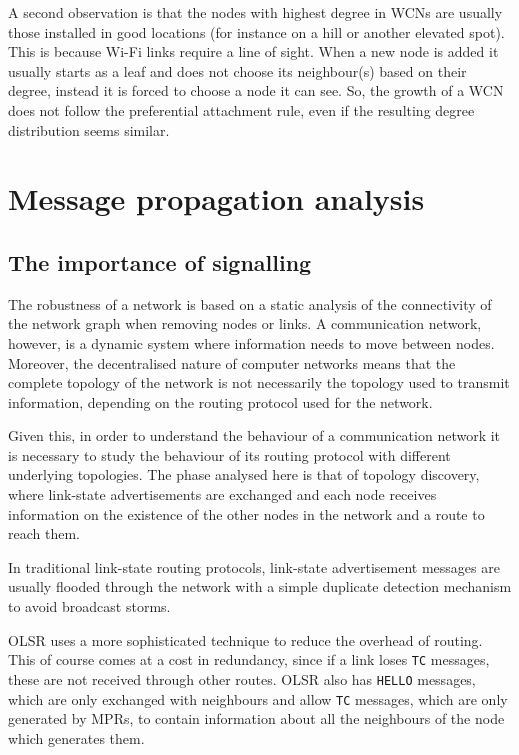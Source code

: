 \documentclass[oneside,openany]{memoir}
\begin{document}
A second observation is that the nodes with highest degree in WCNs
are usually those installed in good locations (for instance on a hill
or another elevated spot). This is because Wi-Fi links require a line
of sight.
When a new node is added it usually starts as a leaf and does not choose
its neighbour(s) based on their degree, instead it is forced to choose
a node it can see.
So, the growth of a WCN does not follow the preferential attachment rule,
even if the resulting degree distribution seems similar.

\chapter{Message propagation
analysis}\label{message-propagation-analysis}

\section{The importance of
signalling}\label{the-importance-of-signalling}

The robustness of a network is based on a static analysis of the
connectivity of the network graph when removing nodes or links. A
communication network, however, is a dynamic system where information
needs to move between nodes. Moreover, the decentralised nature of
computer networks means that the complete topology of the network is not
necessarily the topology used to transmit information, depending on the
routing protocol used for the network.

Given this, in order to understand the behaviour of a communication
network it is necessary to study the behaviour of its routing protocol
with different underlying topologies. The phase analysed here is that of
topology discovery, where link-state advertisements are exchanged and
each node receives information on the existence of the other nodes in
the network and a route to reach them.

In traditional link-state routing protocols, link-state advertisement
messages are usually flooded through the network with a simple duplicate
detection mechanism to avoid broadcast storms.

OLSR uses a more sophisticated technique to reduce the overhead of
routing. This of course comes at a cost in redundancy, since if a link
loses \texttt{TC} messages, these are not received through other routes.
OLSR also has \texttt{HELLO} messages, which are only exchanged with
neighbours and allow \texttt{TC} messages, which are only generated by
MPRs, to contain information about all the neighbours of the node which
generates them.
\end{document}
